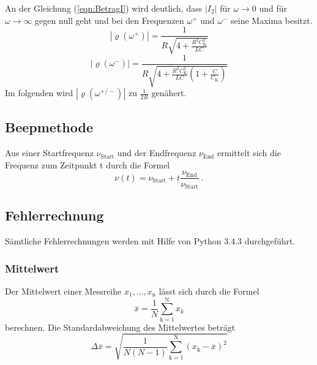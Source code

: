 An der Gleichung (\ref{eqn:BetragI}) wird deutlich, dass $|I_2|$ für $\omega \to 0$ und für $\omega \to \infty$ gegen null geht und bei den Frequenzen $\omega^+$ und $\omega^-$ seine Maxima besitzt.
\begin{equation}
	|\pmb{\varrho}(\omega^+)| = \frac{1}{R \sqrt{4 + \frac{R^2 C^2_\text{K}}{LC}}}
\end{equation}
\begin{equation}
	|\pmb{\varrho}(\omega^-)| = \frac{1}{R \sqrt{4 + \frac{R^2 C^2_\text{K}}{LC} \left(1 + \frac{C}{C_\text{K}} \right)}}
\end{equation}
Im folgenden wird $|\pmb{\varrho}(\omega^{+/-})|$ zu $\frac{1}{2R}$ genähert.

\subsection{Beepmethode}
Aus einer Startfrequenz $\nu_\text{Start}$ und der Endfrequenz $\nu_\text{End}$ ermittelt sich die Frequenz zum Zeitpunkt t durch die Formel 
\begin{equation}
  \nu(t) = \nu_\text{Start} + t \frac{\nu_\text{End}}{\nu_\text{Start}} \ .
  \label{eqn:nut}
\end{equation}
\subsection{Fehlerrechnung}
Sämtliche Fehlerrechnungen werden mit Hilfe von Python 3.4.3 durchgeführt.
\subsubsection{Mittelwert}
Der Mittelwert einer Messreihe $x_\text{1}, ... ,x_\text{n}$ lässt sich durch die Formel
\begin{equation}
	\overline{x} = \frac{1}{N} \sum_{\text{k}=1}^\text{N} x_k
	\label{eqn:ave}
\end{equation}
berechnen. Die Standardabweichung des Mittelwertes beträgt
\begin{equation}
	\Delta \overline{x} = \sqrt{ \frac{1}{N(N-1)} \sum_{\text{k}=1}^\text{N} (x_\text{k} - \overline{x})^2}
	\label{eqn:std}
\end{equation}


